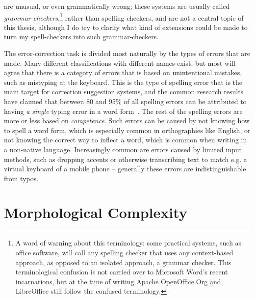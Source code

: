 \documentclass[officiallayout,final]{unihelcompling}
\begin{document}
are unusual, or even grammatically wrong; these systems are usually
called \emph{\glspl{grammar-checker}},\footnote{A word of warning about this
    terminology: some practical systems, such as office software, will call any
    spelling checker that uses any context-based approach, as opposed to an
    isolated approach, a grammar checker. This terminological confusion is not
    carried over to Microsoft Word's recent incarnations, but at the time of
writing Apache OpenOffice.Org and LibreOffice still follow the confused
terminology.} rather than spelling checkers, and are not a
central topic of this thesis, although I do try to clarify what kind of
extensions could be made to turn my spell-checkers into such grammar-checkers.

The error-correction task is divided most naturally by the types of errors that
are made. Many different classifications with different names exist, but most
will agree that there is a category of errors that is based on unintentional
mistakes, such as mistyping at the keyboard. This is the type of spelling error
that is the main target for correction suggestion systems, and the common
research results have claimed that between 80 and 95\% of all spelling errors
can be attributed to having \emph{a single} typing error in a
word form~\citep{kukich1992techniques}. The rest of the spelling errors are
more or less based on \emph{competence}. Such errors can be caused by not
knowing how to spell a word form, which is especially common in orthographies like
English, or not knowing the correct way to inflect a word, which is common when
writing in a non-native language. Increasingly common are errors caused by
limited input methods, such as dropping accents or otherwise transcribing text
to match e.g.  a virtual keyboard of a mobile phone -- generally these errors
are indistinguishable from typos.



\section{Morphological Complexity}
\label{sec:morphological-complexity}
\end{document}
